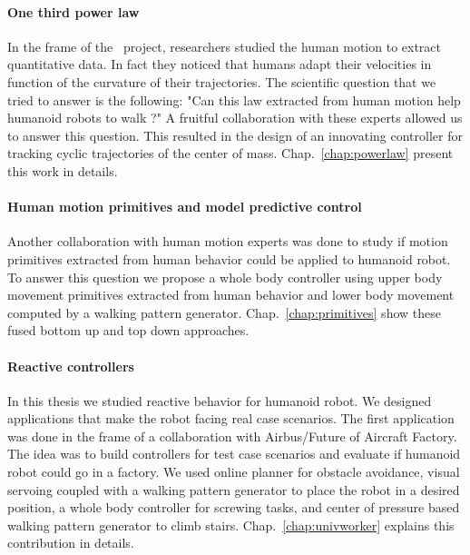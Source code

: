 \paragraph*{One third power law}
In the frame of the \koroibot\ project, researchers studied the human motion to extract quantitative data.
In fact they noticed that humans adapt their velocities in function of the curvature of their trajectories.
The scientific question that we tried to answer is the following: "Can this law extracted from human motion help humanoid robots to walk ?" 
A fruitful collaboration with these experts allowed us to answer this question.
This resulted in the design of an innovating controller for tracking cyclic trajectories of the center of mass.
Chap.~\ref{chap:powerlaw} present this work in details.
\paragraph*{Human motion primitives and model predictive control}
Another collaboration with human motion experts was done to study if motion primitives extracted from human behavior could be applied to humanoid robot.
To answer this question we propose a whole body controller using upper body movement primitives extracted from human behavior and lower body movement computed by a walking pattern generator.
Chap.~\ref{chap:primitives} show these fused bottom up and top down approaches.
\paragraph*{Reactive controllers}
In this thesis we studied reactive behavior for humanoid robot.
We designed applications that make the robot facing real case scenarios.
The first application was done in the frame of a collaboration with Airbus/Future of Aircraft Factory.
The idea was to build controllers for test case scenarios and evaluate if humanoid robot could go in a factory.
We used online planner for obstacle avoidance, visual servoing coupled with a walking pattern generator to place the robot in a desired position, a whole body controller for screwing tasks, and center of pressure based walking pattern generator to climb stairs.
Chap.~\ref{chap:univworker} explains this contribution in details.
